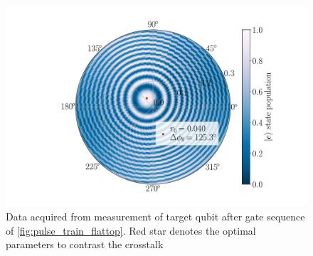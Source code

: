 \begin{figure}
    \centering
    \includegraphics[width=0.9\linewidth]{Images//Chap2.0/circles.pdf}
    \vspace{-0.8cm}
    \caption{Data acquired from measurement of target qubit after gate sequence of \cref{fig:pulse_train_flattop}. Red star denotes the optimal parameters to contrast the crosstalk}
    \label{fig:circles_flat}
\end{figure}

